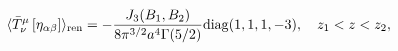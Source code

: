 \begin{equation}
\langle \bar{T}_{\nu }^{\mu }\left[ \eta _{\alpha \beta }\right] \rangle _{%
{\rm ren}}=-\frac{J_3(B_1,B_2)}{8\pi ^{3/2}a^{4}\Gamma (5/2)}{\rm
diag}(1,1,1,-3), \quad z_{1}< z< z_{2}, \label{emtvevflat}
\end{equation}

